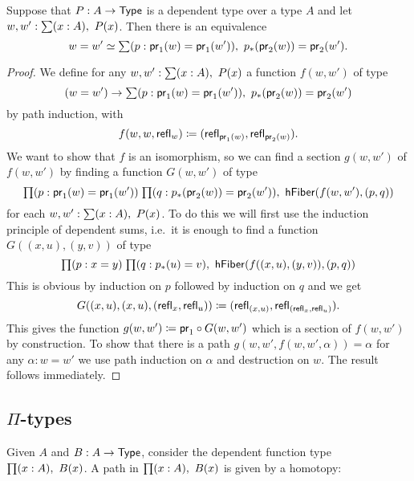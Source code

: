 \begin{thm}
Suppose that $P:A\to\mathsf{Type}$ is a dependent type over a type $A$ and let $w,w^\prime:\sm{x:A}P(x)$. Then there is an equivalence
\begin{equation*}
\eqv{w=w'}{\sm{p:\proj{1}(w)=\proj{1}(w')}\trans{p}{\proj{2}(w)}=\proj{2}(w^\prime)}.
\end{equation*}
\end{thm}

\begin{proof}
We define for any $w,w':\sm{x:A}P(x)$ a function $f(w,w')$ of type
\begin{equation*}
(w=w')\to\sm{p:\proj{1}(w)=\proj{1}(w')}\trans{p}{\proj{2}(w)}=\proj{2}(w^\prime)
\end{equation*}
by path induction, with 
\begin{equation*}
f(w,w,\mathsf{refl}_{w})\coloneqq(\mathsf{refl}_{\mathsf{pr}_{1}(w)},\mathsf{refl}_{\mathsf{pr}_{2}(w)}).
\end{equation*}
We want to show that $f$ is an isomorphism, so we can find a section $g(w,w')$ of $f(w,w')$ by finding a function $G(w,w')$ of type
\begin{equation*}
\prd{p:\proj 1(w)=\proj 1(w')}{q:\trans p{\proj 2(w)}=\proj 2(w')}\mathsf{hFiber}(f(w,w'),(p,q))
\end{equation*}
for each $w,w':\sm{x:A}P(x)$. To do this we will first use the induction principle of dependent sums, i.e.\ it is enough to find a function $G((x,u),(y,v))$ of type
\begin{equation*}
\prd{p:x=y}{q:\trans{p}{u}=v}\hfiber{f((x,u),(y,v))}{(p,q)}
\end{equation*}
This is obvious by induction on $p$ followed by induction on $q$ and we get
\begin{equation*}
G((x,u),(x,u),(\mathsf{refl}_{x},\mathsf{refl}_{u}))\coloneqq(\mathsf{refl}_{(x,u)},\mathsf{refl}_{(\mathsf{refl}_{x},\mathsf{refl}_{u})}).
\end{equation*}
This gives the function $g(w,w')\coloneqq\mathsf{pr}_{1}\circ G(w,w')$ which is a section of $f(w,w')$ by construction. To show that there is a path $g(w,w',f(w,w',\alpha))=\alpha$ for any $\alpha:w=w'$ we use path induction on $\alpha$ and destruction on $w$. The result follows immediately.
\end{proof}
\subsection{$\Pi$-types}

Given $A$ and $B : A \to \mathsf{Type}$, consider the dependent function type $\prd{x:A}B(x)$.
A path in $\prd{x:A} B(x)$ is given by a homotopy:  

